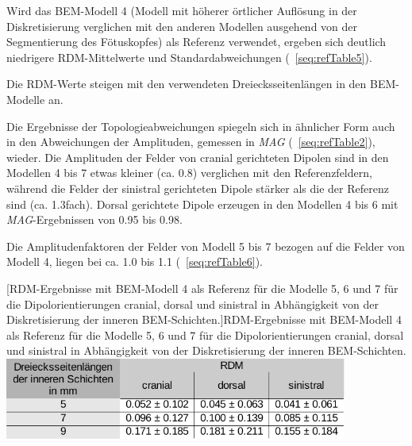 Wird das BEM-Modell 4 (Modell mit höherer örtlicher Auflösung in der
Diskretisierung verglichen mit den anderen Modellen ausgehend von der
Segmentierung des Fötuskopfes) als Referenz verwendet, ergeben sich
deutlich niedrigere RDM-Mittelwerte und Standardabweichungen
(\tablename~\ref{seq:refTable5}).

Die RDM-Werte steigen mit den verwendeten Dreiecksseitenlängen in den
BEM-Modelle an.

Die Ergebnisse der Topologieabweichungen spiegeln sich in ähnlicher Form
auch in den Abweichungen der Amplituden, gemessen in \textit{MAG
}(\tablename~\ref{seq:refTable2}), wieder. Die Amplituden der Felder
von cranial gerichteten Dipolen sind in den Modellen 4 bis 7 etwas
kleiner (ca. 0.8) verglichen mit den Referenzfeldern, während die
Felder der sinistral gerichteten Dipole stärker als die der Referenz
sind (ca. 1.3fach). Dorsal gerichtete Dipole erzeugen in den Modellen 4
bis 6 mit \textit{MAG}{}-Ergebnissen von 0.95 bis 0.98.

Die Amplitudenfaktoren der Felder von Modell 5 bis 7 bezogen auf die
Felder von Modell 4, liegen bei ca. 1.0 bis 1.1
(\tablename~\ref{seq:refTable6}).



\begin{center}
\begin{minipage}{17cm}
[RDM{}-Ergebnisse mit BEM{}-Modell 4 als Referenz für
die Modelle 5, 6 und 7 für die Dipolorientierungen cranial, dorsal und
sinistral in Abhängigkeit von der Diskretisierung der inneren
BEM{}-Schichten.]{RDM-Ergebnisse mit BEM-Modell 4 als Referenz für die
Modelle 5, 6 und 7 für die Dipolorientierungen cranial, dorsal und
sinistral in Abhängigkeit von der Diskretisierung der inneren
BEM-Schichten. }
\label{seq:refTable5}\includegraphics[width=11.269cm,height=2.699cm]{BA-img/BA-img18.pdf}\end{minipage}
\end{center}


